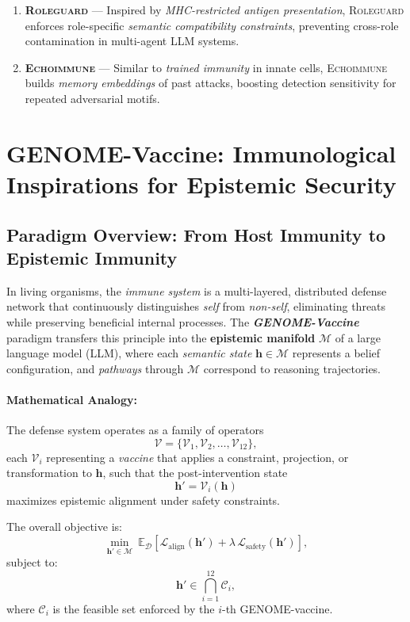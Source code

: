 \begin{itemize}
\begin{enumerate}
        \item \textbf{\textsc{Roleguard}} — Inspired by \emph{MHC-restricted antigen presentation}, \textsc{Roleguard} enforces role-specific \emph{semantic compatibility constraints}, preventing cross-role contamination in multi-agent LLM systems.

        \item \textbf{\textsc{Echoimmune}} — Similar to \emph{trained immunity} in innate cells, \textsc{Echoimmune} builds \emph{memory embeddings} of past attacks, boosting detection sensitivity for repeated adversarial motifs.
    \end{enumerate}
\end{itemize}



\section*{GENOME-Vaccine: Immunological Inspirations for Epistemic Security}

\subsection*{Paradigm Overview: From Host Immunity to Epistemic Immunity}

In living organisms, the \emph{immune system} is a multi-layered, distributed defense network that continuously distinguishes \emph{self} from \emph{non-self}, eliminating threats while preserving beneficial internal processes. The \textbf{\emph{GENOME-Vaccine}} paradigm transfers this principle into the \textbf{epistemic manifold} $\mathcal{M}$ of a large language model (LLM), where each \emph{semantic state} $\mathbf{h} \in \mathcal{M}$ represents a belief configuration, and \emph{pathways} through $\mathcal{M}$ correspond to reasoning trajectories.

\paragraph{Mathematical Analogy:} 
The defense system operates as a family of operators 
\[
\mathcal{V} = \{\mathcal{V}_1, \mathcal{V}_2, \dots, \mathcal{V}_{12}\},
\]
each $\mathcal{V}_i$ representing a \emph{vaccine} that applies a constraint, projection, or transformation to $\mathbf{h}$, such that the post-intervention state 
\[
\mathbf{h}' = \mathcal{V}_i(\mathbf{h})
\]
maximizes epistemic alignment under safety constraints.

The overall objective is:
\[
\min_{\mathbf{h}' \in \mathcal{M}} \ \mathbb{E}_{\mathcal{D}}\left[ \mathcal{L}_\mathrm{align}(\mathbf{h}') + \lambda \, \mathcal{L}_\mathrm{safety}(\mathbf{h}') \right],
\]
subject to:
\[
\mathbf{h}' \in \bigcap_{i=1}^{12} \mathcal{C}_i,
\]
where $\mathcal{C}_i$ is the feasible set enforced by the $i$-th GENOME-vaccine.


